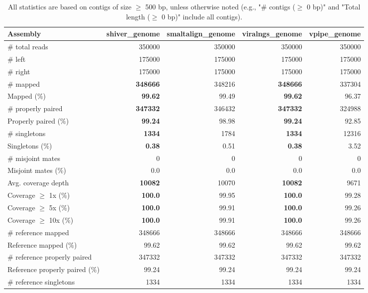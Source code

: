 \documentclass[12pt,a4paper]{article}
\begin{document}
\begin{table}[ht]
\begin{center}
\caption{All statistics are based on contigs of size $\geq$ 500 bp, unless otherwise noted (e.g., "\# contigs ($\geq$ 0 bp)" and "Total length ($\geq$ 0 bp)" include all contigs).}
\begin{tabular}{|l*{4}{|r}|}
\hline
Assembly & shiver\_genome & smaltalign\_genome & viralngs\_genome & vpipe\_genome \\ \hline
\# total reads & 350000 & 350000 & 350000 & 350000 \\ \hline
\# left & 175000 & 175000 & 175000 & 175000 \\ \hline
\# right & 175000 & 175000 & 175000 & 175000 \\ \hline
\# mapped & {\bf 348666} & 348216 & {\bf 348666} & 337304 \\ \hline
Mapped (\%) & {\bf 99.62} & 99.49 & {\bf 99.62} & 96.37 \\ \hline
\# properly paired & {\bf 347332} & 346432 & {\bf 347332} & 324988 \\ \hline
Properly paired (\%) & {\bf 99.24} & 98.98 & {\bf 99.24} & 92.85 \\ \hline
\# singletons & {\bf 1334} & 1784 & {\bf 1334} & 12316 \\ \hline
Singletons (\%) & {\bf 0.38} & 0.51 & {\bf 0.38} & 3.52 \\ \hline
\# misjoint mates & 0 & 0 & 0 & 0 \\ \hline
Misjoint mates (\%) & 0.0 & 0.0 & 0.0 & 0.0 \\ \hline
Avg. coverage depth & {\bf 10082} & 10070 & {\bf 10082} & 9671 \\ \hline
Coverage $\geq$ 1x (\%) & {\bf 100.0} & 99.95 & {\bf 100.0} & 99.28 \\ \hline
Coverage $\geq$ 5x (\%) & {\bf 100.0} & 99.91 & {\bf 100.0} & 99.26 \\ \hline
Coverage $\geq$ 10x (\%) & {\bf 100.0} & 99.91 & {\bf 100.0} & 99.26 \\ \hline
\# reference mapped & 348666 & 348666 & 348666 & 348666 \\ \hline
Reference mapped (\%) & 99.62 & 99.62 & 99.62 & 99.62 \\ \hline
\# reference properly paired & 347332 & 347332 & 347332 & 347332 \\ \hline
Reference properly paired (\%) & 99.24 & 99.24 & 99.24 & 99.24 \\ \hline
\# reference singletons & 1334 & 1334 & 1334 & 1334 \\ \hline

\end{tabular}
\end{center}
\end{table}
\end{document}
